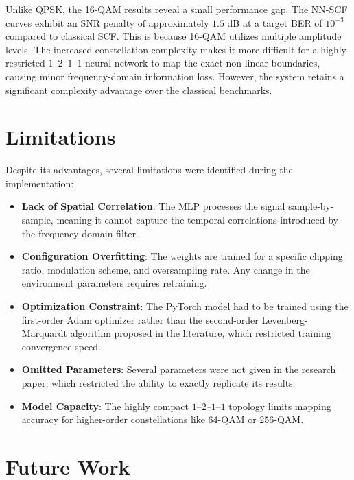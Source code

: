 Unlike QPSK, the 16-QAM results reveal a small performance gap. The NN-SCF curves exhibit an SNR penalty of approximately $1.5$ dB at a target BER of $10^{-3}$ compared to classical SCF. This is because 16-QAM utilizes multiple amplitude levels. The increased constellation complexity makes it more difficult for a highly restricted $1\text{--}2\text{--}1\text{--}1$ neural network to map the exact non-linear boundaries, causing minor frequency-domain information loss. However, the system retains a significant complexity advantage over the classical benchmarks.

\section{Limitations}
\label{sec:nnscf_limitations}

Despite its advantages, several limitations were identified during the implementation:
\begin{itemize}
    \item \textbf{Lack of Spatial Correlation}: The MLP processes the signal sample-by-sample, meaning it cannot capture the temporal correlations introduced by the frequency-domain filter.
    \item \textbf{Configuration Overfitting}: The weights are trained for a specific clipping ratio, modulation scheme, and oversampling rate. Any change in the environment parameters requires retraining.
    \item \textbf{Optimization Constraint}: The PyTorch model had to be trained using the first-order Adam optimizer rather than the second-order Levenberg-Marquardt algorithm proposed in the literature, which restricted training convergence speed.
    \item \textbf{Omitted Parameters}: Several parameters were not given in the research paper, which restricted the ability to exactly replicate its results.
    \item \textbf{Model Capacity}: The highly compact $1\text{--}2\text{--}1\text{--}1$ topology limits mapping accuracy for higher-order constellations like 64-QAM or 256-QAM.
\end{itemize}

\section{Future Work}
\label{sec:nnscf_future_work}

